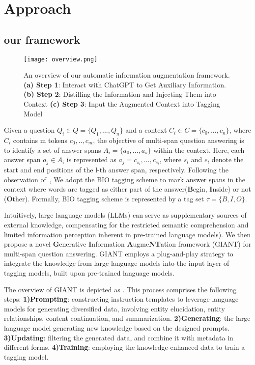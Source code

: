 \section{Approach}
\subsection{our framework}
\begin{figure*}[h]
	\centering
	\texttt{[image: overview.png]}
	\caption{An overview of our automatic information augmentation framework. \textbf{(a) Step 1}: Interact with ChatGPT to Get Auxiliary Information. \textbf{(b) Step 2}: Distilling the Information and Injecting Them into Context \textbf{(c) Step 3}: Input the Augmented Context into Tagging Model}
	\label{fig:overview}
\end{figure*}   

 Given a question $Q_i \in Q = \{Q_1,...,Q_n\}$ and a context $C_i \in C = \{c_0,...,c_n\}$, where $C_i$ contains m tokens $c_0,..,c_m$, the objective of multi-span question answering is to identify a set of answer spans $A_i = \{a_0,...,a_s\}$ within the context. Here, each answer span $a_j \in A_i$ is represented as $a_j = c_{s_l},...,c_{e_l}$, where $s_l$ and $e_l$ denote the start and end positions of the l-th answer span, respectively.
 Following the observation of~\cite{li2022multispanqa}, We adopt the BIO tagging scheme to mark answer spans in the context where words are tagged as either part of the answer(\textbf{B}egin, \textbf{I}nside) or not (\textbf{O}ther). Formally, BIO tagging scheme is represented by a tag set $\tau = \{B, I, O\}$.

 Intuitively, large language models (LLMs) can serve as supplementary sources of external knowledge, compensating for the restricted semantic comprehension and limited information perception inherent in pre-trained language models). 
 We then propose a novel \textbf{G}enerative \textbf{I}nformation \textbf{A}ugme\textbf{NT}ation framework (GIANT) for multi-span question answering.
 GIANT employs a plug-and-play strategy to integrate the knowledge from large language models into the input layer of tagging models, built upon pre-trained language models.
 
 
 The overview of GIANT is depicted as .
 This process comprises the following steps:
 \textbf{1)Prompting}: constructing instruction templates to leverage language models for generating diversified data, involving entity elucidation, entity relationships, content continuation, and summarization.
 \textbf{2)Generating}: the large language model generating new knowledge based on the designed prompts.
 \textbf{3)Updating}: filtering the generated data, and combine it with metadata in different forms.
 \textbf{4)Training}: employing the knowledge-enhanced data to train a tagging model.
 

